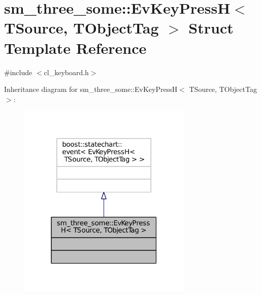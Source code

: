 \hypertarget{structsm__three__some_1_1EvKeyPressH}{}\section{sm\+\_\+three\+\_\+some\+:\+:Ev\+Key\+PressH$<$ T\+Source, T\+Object\+Tag $>$ Struct Template Reference}
\label{structsm__three__some_1_1EvKeyPressH}


{\ttfamily \#include $<$cl\+\_\+keyboard.\+h$>$}



Inheritance diagram for sm\+\_\+three\+\_\+some\+:\+:Ev\+Key\+PressH$<$ T\+Source, T\+Object\+Tag $>$\+:
\nopagebreak
\begin{figure}[H]
\begin{center}
\leavevmode
\includegraphics[width=235pt]{structsm__three__some_1_1EvKeyPressH__inherit__graph}
\end{center}
\end{figure}


